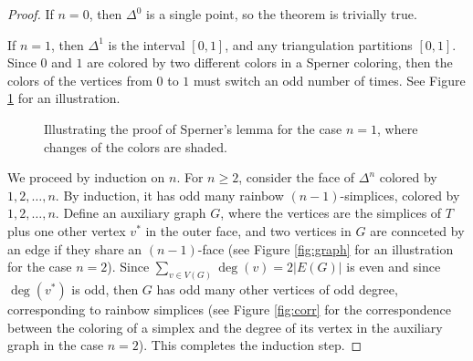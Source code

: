 \documentclass[letterpaper, reqno,12pt]{article}
\begin{document}
\begin{proof}
  If $n = 0$, then $\Delta^0$ is a single point, so the theorem is trivially true.

  If $n = 1$, then $\Delta^1$ is the interval $[0, 1]$, and any triangulation partitions $[0, 1]$. Since $0$ and $1$ are colored by two different colors in a Sperner coloring, then the colors of the vertices from $0$ to $1$ must switch an odd number of times. See Figure \ref{fig:sperner-1} for an illustration.

  \begin{figure}[h]
    \centering
    \caption{Illustrating the proof of Sperner's lemma for the case $n = 1$, where changes of the colors are shaded.}
    \label{fig:sperner-1}
  \end{figure}

  We proceed by induction on $n$. For $n \geq 2$, consider the face of $\Delta^n$ colored by $1, 2, \ldots, n$. By induction, it has odd many rainbow $(n - 1)$-simplices, colored by $1, 2, \ldots, n$. Define an auxiliary graph $G$, where the vertices are the simplices of $T$ plus one other vertex $v^*$ in the outer face, and two vertices in $G$ are connceted by an edge if they share an $(n - 1)$-face (see Figure \ref{fig:graph} for an illustration for the case $n = 2$). Since $\sum_{v \in V(G)} \deg(v) = 2|E(G)|$ is even and since $\deg(v^*)$ is odd, then $G$ has odd many other vertices of odd degree, corresponding to rainbow simplices (see Figure \ref{fig:corr} for the correspondence between the coloring of a simplex and the degree of its vertex in the auxiliary graph in the case $n = 2$). This completes the induction step.


\end{proof}
\end{document}
